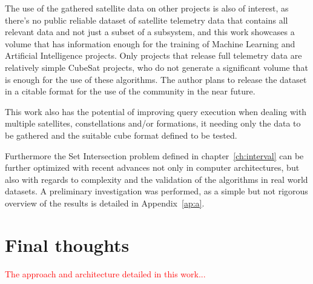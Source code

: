 The use of the gathered satellite data on other projects is also of interest, as there's no public reliable dataset of satellite telemetry data that contains all relevant data and not just a subset of a subsystem, and this work showcases a volume that has information enough for the training of Machine Learning and Artificial Intelligence projects.
Only projects that release full telemetry data are relatively simple CubeSat projects, who do not generate a significant volume that is enough for the use of these algorithms.
The author plans to release the dataset in a citable format for the use of the community in the near future.

This work also has the potential of improving query execution when dealing with multiple satellites, constellations and/or formations, it needing only the data to be gathered and the suitable cube format defined to be tested.

Furthermore the Set Intersection problem defined in chapter~\ref{ch:interval} can be further optimized with recent advances not only in computer architectures, but also with regards to complexity and the validation of the algorithms in real world datasets.
A preliminary investigation was performed, as a simple but not rigorous overview of the results is detailed in Appendix~\ref{ap:a}.

\section{Final thoughts}\label{ch:concl:future}

\textcolor{red}{The approach and architecture detailed in this work...}

